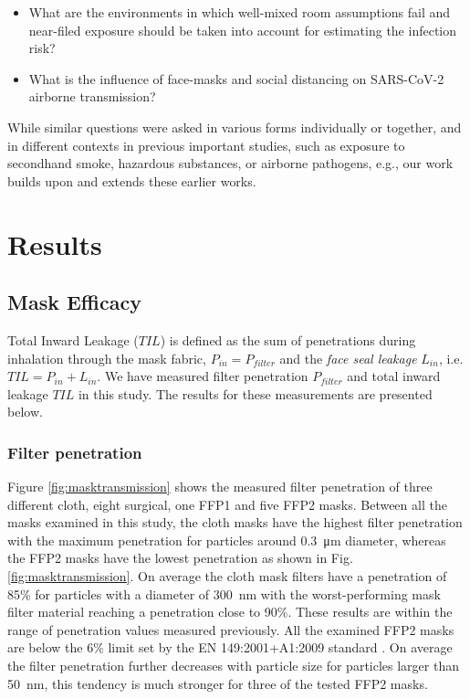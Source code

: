 \documentclass[preprint]{elsarticle}
\begin{document}
\begin{itemize}
\item{ What are the environments in which well-mixed room assumptions fail and near-filed exposure should be taken into account for estimating the infection risk?}
\item{ What is the influence of face-masks and social distancing on SARS-CoV-2 airborne transmission?}
\end{itemize}

\noindent While similar questions were asked in various forms individually or together, and in different contexts in previous important studies, such as exposure to secondhand smoke, hazardous substances, or airborne pathogens, e.g., \cite{Klepeis1999, Nazaroff2008, Licina2017, Lelieveld2020, Yang2020,Abkarian2020, BUONANNO_2020, Pohlker2021, cheng2021face} our work builds upon and extends these earlier works. 

\section{Results}
\subsection{Mask Efficacy}
 Total Inward Leakage ($TIL$) is defined as the sum of penetrations during inhalation through the mask fabric, $P_{in}=P_{filter}$ and the \emph{face seal leakage} $L_{in}$, i.e. $TIL = P_{in}+L_{in}$. We have measured filter penetration $P_{filter}$ and total inward leakage $TIL$ in this study. The results for these measurements are presented below.\\
\subsubsection{Filter penetration}
Figure \ref{fig:masktransmission} shows the measured filter penetration of three different cloth, eight surgical, one FFP1 and five FFP2 masks.
Between all the masks examined in this study, the cloth masks have the highest filter penetration with the maximum penetration for particles around \SI{0.3}{\micro\meter} diameter, whereas the FFP2 masks have the lowest penetration as shown in Fig. \ref{fig:masktransmission}. On average the cloth mask filters have a penetration of 85\% for particles with a diameter of \SI{300}{\nano \meter} with the worst-performing mask filter material reaching a penetration close to 90\%. These results are within the range of penetration values measured previously\cite{zangmeister2020filtration, morais2021filtration, konda2020aerosol,Drewnick2021}. All the examined FFP2 masks are below the 6\% limit set by the EN 149:2001+A1:2009 standard \cite{DinNorm}. On average the filter penetration further decreases with particle size for particles larger than \SI{50}{\nano \meter}, this tendency is much stronger for three of the tested FFP2 masks.
\end{document}
